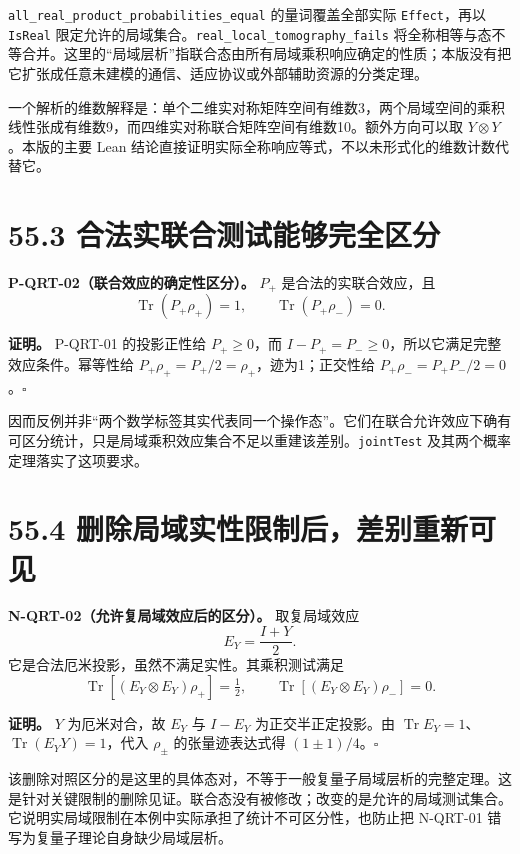 \documentclass[
  11pt,
  oneside]{book}
\begin{document}
\texttt{all\_\allowbreak real\_\allowbreak product\_\allowbreak probabilities\_\allowbreak equal} 的量词覆盖全部实际
\texttt{Effect}，再以 \texttt{Is\allowbreak Real}
限定允许的局域集合。\texttt{real\_\allowbreak local\_\allowbreak tomography\_\allowbreak fails}
将全称相等与态不等合并。这里的``局域层析''指联合态由所有局域乘积响应确定的性质；本版没有把它扩张成任意未建模的通信、适应协议或外部辅助资源的分类定理。

一个解析的维数解释是：单个二维实对称矩阵空间有维数3，两个局域空间的乘积线性张成有维数9，而四维实对称联合矩阵空间有维数10。额外方向可以取
\(Y\otimes Y\)。本版的主要 Lean
结论直接证明实际全称响应等式，不以未形式化的维数计数代替它。

\section{55.3 合法实联合测试能够完全区分}

\protect\hypertarget{p-qrt-02}{}{}

\textbf{P-QRT-02（联合效应的确定性区分）。} \(P_+\)
是合法的实联合效应，且 \[
\operatorname{Tr}(P_+\rho_+)=1,\qquad
\operatorname{Tr}(P_+\rho_-)=0.
\]

\textbf{证明。} P-QRT-01 的投影正性给 \(P_+\ge0\)，而
\(I-P_+=P_-\ge0\)，所以它满足完整效应条件。幂等性给
\(P_+\rho_+=P_+/2=\rho_+\)，迹为1；正交性给
\(P_+\rho_-=P_+P_-/2=0\)。\(\square\)

因而反例并非``两个数学标签其实代表同一个操作态''。它们在联合允许效应下确有可区分统计，只是局域乘积效应集合不足以重建该差别。\texttt{joint\allowbreak Test}
及其两个概率定理落实了这项要求。

\section{55.4 删除局域实性限制后，差别重新可见}

\protect\hypertarget{n-qrt-02}{}{}

\textbf{N-QRT-02（允许复局域效应后的区分）。} 取复局域效应 \[
E_Y=\frac{I+Y}{2}.
\] 它是合法厄米投影，虽然不满足实性。其乘积测试满足 \[
\operatorname{Tr}[(E_Y\otimes E_Y)\rho_+]=\tfrac12,
\qquad \operatorname{Tr}[(E_Y\otimes E_Y)\rho_-]=0.
\]

\textbf{证明。} \(Y\) 为厄米对合，故 \(E_Y\) 与 \(I-E_Y\)
为正交半正定投影。由
\(\operatorname{Tr}E_Y=1\)、\(\operatorname{Tr}(E_YY)=1\)，代入
\(\rho_\pm\) 的张量迹表达式得 \((1\pm1)/4\)。\(\square\)

该删除对照区分的是这里的具体态对，不等于一般复量子局域层析的完整定理。这是针对关键限制的删除见证。联合态没有被修改；改变的是允许的局域测试集合。它说明实局域限制在本例中实际承担了统计不可区分性，也防止把
N-QRT-01 错写为复量子理论自身缺少局域层析。
\end{document}
